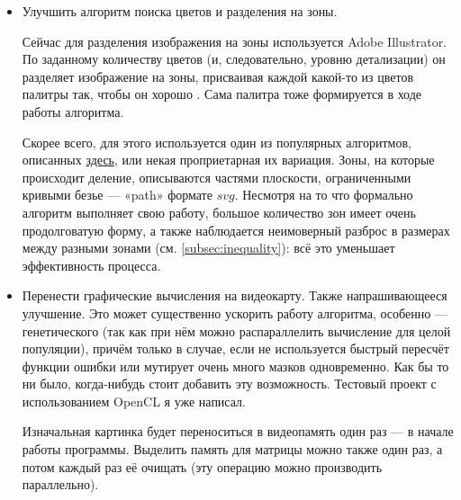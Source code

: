 \documentclass[11pt]{article}
\begin{document}
\begin{itemize}
        \item Улучшить алгоритм поиска цветов и разделения на зоны.

                Сейчас для разделения изображения на зоны используется Adobe Illustrator.
                По заданному количеству цветов (и, следовательно, уровню детализации) он разделяет изображение на зоны,
                присваивая каждой какой-то из цветов палитры так, чтобы он хорошо .
                Сама палитра тоже формируется в ходе работы алгоритма.

                Скорее всего, для этого используется один из популярных алгоритмов, описанных \href{https://en.wikipedia.org/wiki/Color_quantization}{здесь}, или некая проприетарная их вариация.
                Зоны, на которые происходит деление, описываются частями плоскости, ограниченными кривыми безье — «path»  формате $svg$.
                Несмотря на то что формально алгоритм выполняет свою работу, большое количество зон имеет очень продолговатую форму,
                а также наблюдается неимоверный разброс в размерах между разными зонами (см. \ref{subsec:inequality}):
                всё это уменьшает эффективность процесса.


        \item Перенести графические вычисления на видеокарту.
                Также напрашивающееся улучшение.
                Это может существенно ускорить работу алгоритма, особенно — генетического (так как при нём можно распараллелить вычисление для целой популяции),
                причём только в случае, если не используется быстрый пересчёт функции ошибки или мутирует очень много мазков одновременно.
                Как бы то ни было, когда-нибудь стоит добавить эту возможность.
                Тестовый проект с использованием OpenCL я уже написал.

                Изначальная картинка будет переноситься в видеопамять один раз — в начале работы программы.
                Выделить память для матрицы можно также один раз, а потом каждый раз её очищать (эту операцию можно производить параллельно).


\end{itemize}
\end{document}

